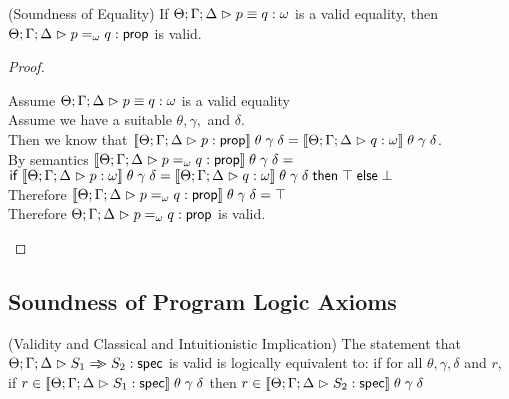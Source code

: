 \begin{lemma}{(Soundness of Equality)}
  If $\judgeEqA{p}{q}{\omega}$ is a valid equality, then $\judgeA{p =_\omega q}{\assert}$ is valid.
\end{lemma}
\begin{proof}
\begin{tabbedproof}
\oo Assume $\judgeEqA{p}{q}{\omega}$ is a valid equality \\
\oo Assume we have a suitable $\theta, \gamma,$ and $\delta$. \\ 
\ooo Then we know that $\interp{\judgeA{p}{\assert}}\;\theta\;\gamma\;\delta = \interp{\judgeA{q}{\omega}}\;\theta\;\gamma\;\delta$. \\
\ooo By semantics $\interp{\judgeA{p =_\omega q}{\assert}}\;\theta\;\gamma\;\delta = $
\ooox $\IfTE{\interp{\judgeA{p}{\omega}}\;\theta\;\gamma\;\delta = \interp{\judgeA{q}{\omega}}\;\theta\;\gamma\;\delta}{\top}{\bot}$ \\
\ooo Therefore $\interp{\judgeA{p =_\omega q}{\assert}}\;\theta\;\gamma\;\delta = \top$ \\
\oo Therefore $\judgeA{p =_\omega q}{\assert}$ is valid.
\end{tabbedproof}
\end{proof}

\subsection{Soundness of Program Logic Axioms}

\begin{lemma}{(Validity and Classical and Intuitionistic Implication)}
The statement that $\judgeS{S_1 \specimp S_2}$ is valid is logically equivalent to: if
for all $\theta, \gamma, \delta$ and $r$, if $r \in \interp{\judgeS{S_1}}\;\theta\;\gamma\;\delta$ then $r \in \interp{\judgeS{S_2}}\;\theta\;\gamma\;\delta$  
\end{lemma}

